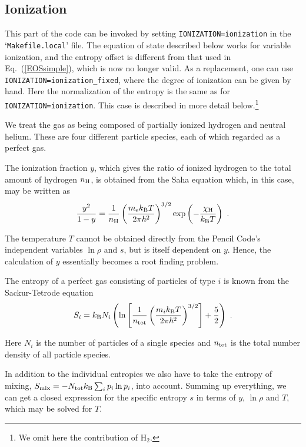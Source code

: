 \documentclass[\mydriver,12pt,twoside,notitlepage,a4paper]{article}
\makeatletter
\newcommand{\code}[1]{\texttt{#1}}
\newcommand{\file}[2][]{%
  \def\index@{#1}%
  `\texttt{#2}'%
  \ifx\index@\@empty\index[file]{#2@\texttt{#2}}%
  \else\index[file]{#1@\texttt{#1}}%
  \fi%
}
\makeatother
\begin{document}
\subsection{Ionization}
\label{S-ionization}

This part of the code can be invoked by setting
\code{IONIZATION=ionization} in the \file{Makefile.local} file.
The equation of state described below works for variable ionization,
and the entropy offset is different from that used in
Eq.~(\ref{EOSsimple}), which is now no longer valid.
As a replacement, one can use \code{IONIZATION=ionization\_fixed},
where the degree of ionization can be given by hand.
Here the normalization of the entropy is the same as for
\code{IONIZATION=ionization}.
This case is described in more detail below.\footnote{We omit here
the contribution of H$_2$.}

We treat the gas as being composed of partially ionized hydrogen and neutral
helium. These are four different particle species, each of which regarded as
a perfect gas.

The ionization fraction $y$, which gives the ratio of ionized hydrogen to the
total amount of hydrogen $n_{\rm H}$, is obtained from the Saha equation
which, in this case, may be written as
\begin{equation}
\frac{y^2}{1-y}=\frac{1}{n_{\rm H}}
\left(\frac{m_{\rm e}k_{\rm B}T}{2\pi\hbar^2}\right)^{3/2}
\exp\left(-\frac{\chi_{\rm H}}{k_{\rm B}T}\right)\ .
\end{equation}

The temperature $T$ cannot be obtained directly from the {\sc Pencil Code}'s
independent variables $\ln\rho$ and $s$, but is itself dependent on $y$.
Hence, the calculation of $y$ essentially becomes a root finding problem.

The entropy of a perfect gas consisting of particles of type $i$ is known from
the Sackur-Tetrode equation
\begin{equation}
S_i=k_{\rm B}N_i\left(\ln\left[\frac{1}{n_{\rm tot}}
                               \left(\frac{m_ik_{\rm B}T}
                                     {2\pi\hbar^2}\right)^{3/2}\right]
                      +\frac{5}{2}\right)\ .
\end{equation}

Here $N_i$ is the number of particles of a single species and $n_{\rm tot}$
is the total number density of all particle species.

In addition to the individual entropies we also have to take the entropy of
mixing, \mbox{$S_{\rm mix}=-N_{\rm tot}k_{\rm B}\sum_ip_i\ln p_i$}, into
account. Summing up everything, we can get a closed expression for the
specific entropy $s$ in terms of $y$, $\ln\rho$ and $T$, which may be solved
for $T$.
\end{document}
